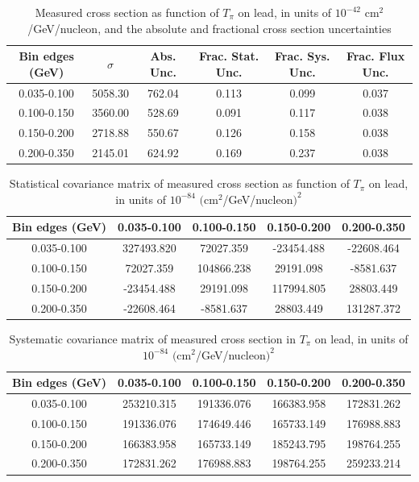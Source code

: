 \documentclass[../main.tex]{subfiles}
\begin{document}
\pagebreak
\begin{turnpage}
\end{turnpage}
\begin{table}
  \centering
  \renewcommand{\arraystretch}{1.15}
  \caption{Measured cross section as function of $T_{\pi}$ on lead, in units of $10^{-42}$ $\text{cm}^2$/GeV/nucleon, and the absolute and fractional cross section uncertainties}
    \begin{tabular}{c||c|c||c|c|c}
      Bin edges (GeV) &  $\sigma$  &  Abs. Unc.  &  Frac. Stat. Unc.  &  Frac. Sys. Unc.  &  Frac. Flux Unc. \\
      \hline
      \hline
      0.035-0.100 & 5058.30 & 762.04 & 0.113 & 0.099 & 0.037\\
      0.100-0.150 & 3560.00 & 528.69 & 0.091 & 0.117 & 0.038\\
      0.150-0.200 & 2718.88 & 550.67 & 0.126 & 0.158 & 0.038\\
      0.200-0.350 & 2145.01 & 624.92 & 0.169 & 0.237 & 0.038
    \end{tabular}
  \label{tbl:datanucleonnuc82pion_ekina}
\end{table}
\begin{table}
  \centering
  \renewcommand{\arraystretch}{1.15}
  \caption{Statistical covariance matrix of measured cross section as function of $T_{\pi}$ on lead, in units of $10^{-84}$ $(\text{cm}^2$/GeV/nucleon$)^2$}
    \begin{tabular}{c||cccc}
      Bin edges (GeV) & 0.035-0.100 & 0.100-0.150 & 0.150-0.200 & 0.200-0.350\\
      \hline
      \hline
      0.035-0.100 & 327493.820 & 72027.359 & -23454.488 & -22608.464\\
      0.100-0.150 & 72027.359 & 104866.238 & 29191.098 & -8581.637\\
      0.150-0.200 & -23454.488 & 29191.098 & 117994.805 & 28803.449\\
      0.200-0.350 & -22608.464 & -8581.637 & 28803.449 & 131287.372
    \end{tabular}
  \label{tbl:statnucleonnuc82pion_ekinb}
\end{table}
\begin{table}
  \centering
  \renewcommand{\arraystretch}{1.15}
  \caption{Systematic covariance matrix of measured cross section in $T_{\pi}$ on lead, in units of $10^{-84}$ $(\text{cm}^2$/GeV/nucleon$)^2$}
    \begin{tabular}{c||cccc}
      Bin edges (GeV) & 0.035-0.100 & 0.100-0.150 & 0.150-0.200 & 0.200-0.350\\
      \hline
      \hline
      0.035-0.100 & 253210.315 & 191336.076 & 166383.958 & 172831.262\\
      0.100-0.150 & 191336.076 & 174649.446 & 165733.149 & 176988.883\\
      0.150-0.200 & 166383.958 & 165733.149 & 185243.795 & 198764.255\\
      0.200-0.350 & 172831.262 & 176988.883 & 198764.255 & 259233.214
    \end{tabular}
  \label{tbl:sysnucleonnuc82pion_ekinc}
\end{table}
\end{document}
